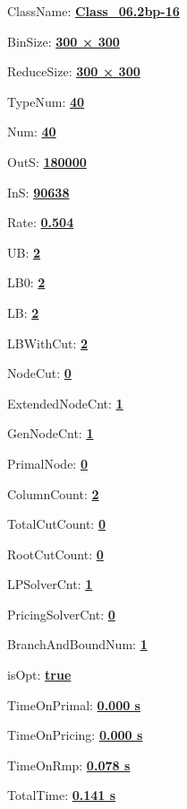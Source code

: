 \documentclass[11pt]{article}
\begin{document}
\pagestyle{empty}


ClassName: \underline{\textbf{Class_06.2bp-16}}
\par
BinSize: \underline{\textbf{300 × 300}}
\par
ReduceSize: \underline{\textbf{300 × 300}}
\par
TypeNum: \underline{\textbf{40}}
\par
Num: \underline{\textbf{40}}
\par
OutS: \underline{\textbf{180000}}
\par
InS: \underline{\textbf{90638}}
\par
Rate: \underline{\textbf{0.504}}
\par
UB: \underline{\textbf{2}}
\par
LB0: \underline{\textbf{2}}
\par
LB: \underline{\textbf{2}}
\par
LBWithCut: \underline{\textbf{2}}
\par
NodeCut: \underline{\textbf{0}}
\par
ExtendedNodeCnt: \underline{\textbf{1}}
\par
GenNodeCnt: \underline{\textbf{1}}
\par
PrimalNode: \underline{\textbf{0}}
\par
ColumnCount: \underline{\textbf{2}}
\par
TotalCutCount: \underline{\textbf{0}}
\par
RootCutCount: \underline{\textbf{0}}
\par
LPSolverCnt: \underline{\textbf{1}}
\par
PricingSolverCnt: \underline{\textbf{0}}
\par
BranchAndBoundNum: \underline{\textbf{1}}
\par
isOpt: \underline{\textbf{true}}
\par
TimeOnPrimal: \underline{\textbf{0.000 s}}
\par
TimeOnPricing: \underline{\textbf{0.000 s}}
\par
TimeOnRmp: \underline{\textbf{0.078 s}}
\par
TotalTime: \underline{\textbf{0.141 s}}
\par
\newpage
\end{document}
